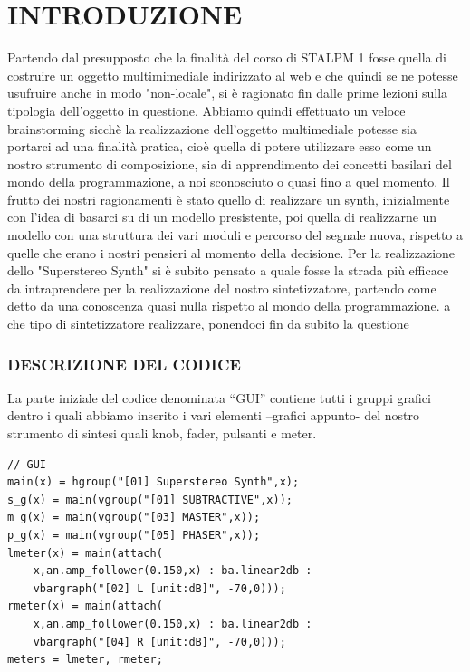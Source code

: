 \documentclass[
	a4paper,
	twocolumn
	]{article}
\begin{document}
\maketitle
\thispagestyle{empty}
\section*{INTRODUZIONE}
Partendo dal presupposto che la finalità del corso di STALPM 1 fosse quella
di costruire un oggetto multimimediale indirizzato al web e che quindi se ne
potesse usufruire anche in modo "non-locale", si è ragionato fin dalle prime
lezioni sulla tipologia dell'oggetto in questione. Abbiamo quindi effettuato
un veloce brainstorming sicchè la realizzazione dell'oggetto multimediale
potesse sia portarci ad una finalità pratica, cioè quella di potere utilizzare
esso come un nostro strumento di composizione, sia di apprendimento dei concetti
basilari del mondo della programmazione, a noi sconosciuto o quasi fino a quel
momento. Il frutto dei nostri ragionamenti è stato quello di realizzare un synth,
inizialmente con l'idea di basarci su di un modello presistente, poi quella di
realizzarne un modello con una struttura dei vari moduli e percorso del segnale
nuova, rispetto a quelle che erano i nostri pensieri al momento della decisione.
Per la realizzazione dello "Superstereo Synth" si è subito pensato a quale fosse
la strada più efficace da intraprendere per la realizzazione del nostro
sintetizzatore, partendo come detto da una conoscenza quasi nulla rispetto al
mondo della programmazione.  a che tipo di
sintetizzatore realizzare, ponendoci fin da subito la questione
\subsubsection*{DESCRIZIONE DEL CODICE}
La parte iniziale del codice denominata “GUI” contiene tutti i gruppi grafici dentro i quali abbiamo inserito i vari elementi –grafici appunto- del nostro strumento di sintesi quali knob, fader, pulsanti e meter.

\begin{lstlisting}
// GUI
main(x) = hgroup("[01] Superstereo Synth",x);
s_g(x) = main(vgroup("[01] SUBTRACTIVE",x));
m_g(x) = main(vgroup("[03] MASTER",x));
p_g(x) = main(vgroup("[05] PHASER",x));
lmeter(x) = main(attach(
	x,an.amp_follower(0.150,x) : ba.linear2db :
	vbargraph("[02] L [unit:dB]", -70,0)));
rmeter(x) = main(attach(
	x,an.amp_follower(0.150,x) : ba.linear2db :
	vbargraph("[04] R [unit:dB]", -70,0)));
meters = lmeter, rmeter;
\end{lstlisting}
\end{document}
